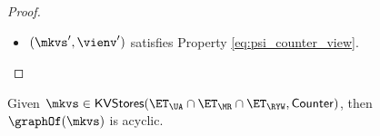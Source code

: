 \begin{proof}
\begin{itemize}
\begin{itemize}
\begin{itemize}
\item $\txid' \in \txidset'_{i}$. We need to distinguish the cases $i \neq m$, leading to $\txidset'_{i} = \txidset_{i}$, 
or $i = m$, in which case $\txidset'_{i} = \txidset'_{m} = \txidset_{m} \cup \{\txid\}$. If either $i \neq m$, or $i = m$ and $\txid \in 
\txidset_{m}$, then we can proceed as in the case $\txid' = \txid_{i}$. Otherwise, suppose that $i = m$ and 
$\txid' = \txid$. Then, because $\txid' \toEDGE{\SO} \txid''$, and $\txid \in \nextTxid(\mkvs,\cl)$, 
it must be the case that $\txid = \txid_{\cl}^{p}$ for some $p \geq 0$, and whenever 
$\txid_{\cl}^{\cdot} \in \key$, then $\txid_{\cl}^{\cdot} \toEDGE{\SO} \txid$. In particular 
we cannot have that $\txid'' \in \key$, because $\txid \toEDGE{\SO} \txid''$, which 
concludes the proof.
\end{itemize}

\item $(\mkvs', \vienv')$ satisfies Property \eqref{eq:psi_counter_view}.

\end{itemize}

\end{itemize}

\end{proof}

\begin{corollary}
\label{cor:psi_counter_acyclic}
Given $\mkvs \in \mathsf{KVStores}(\ET_{\UA} \cap \ET_{\MR} \cap \ET_{\RYW}, \mathsf{Counter})$, 
then $\graphOf(\mkvs)$ is acyclic.
\end{corollary}

